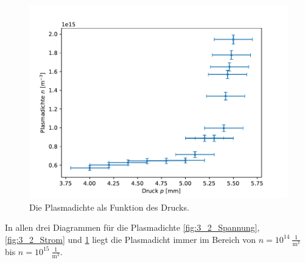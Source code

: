\begin{figure}[H]
\centering
\includegraphics[scale=0.6]{3_2_Druck.pdf}
\caption{Die Plasmadichte als Funktion des Drucks.}
\label{fig:3_2_Druck}
\end{figure}
In allen drei Diagrammen für die Plasmadichte  \ref{fig:3_2_Spannung}, \ref{fig:3_2_Strom} und  \ref{fig:3_2_Druck} liegt die Plasmadicht immer im Bereich von $n=10^{14}\ \frac{1}{\mathrm{m}^3}$ bis  $n=10^{15}\ \frac{1}{\mathrm{m}^3}$.

